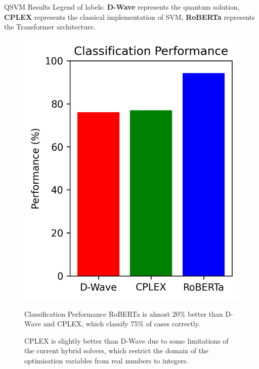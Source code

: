 \begin{block}{QSVM Results}
    Legend of labels: \textbf{D-Wave} represents the quantum solution, \textbf{CPLEX} represents the classical implementation of SVM, \textbf{RoBERTa} represents the Transformer architecture.

    \begin{figure}[h!]
        \centering
        \begin{minipage}{0.3\textwidth}
            \centering
            \includegraphics[height=0.14\textheight]{logos/performance.png}
        \end{minipage}%
        \hfill
        \begin{minipage}{0.65\textwidth}
            \begin{alertblock}{Classification Performance}
                RoBERTa is almost 20\% better than D-Wave and CPLEX, which classify 75\% of cases correctly.
            
                CPLEX is slightly better than D-Wave due to some limitations of the current hybrid solvers, which restrict the domain of the optimisation variables from real numbers to integers.
            \end{alertblock}
        \end{minipage}
    \end{figure}


\end{block}
